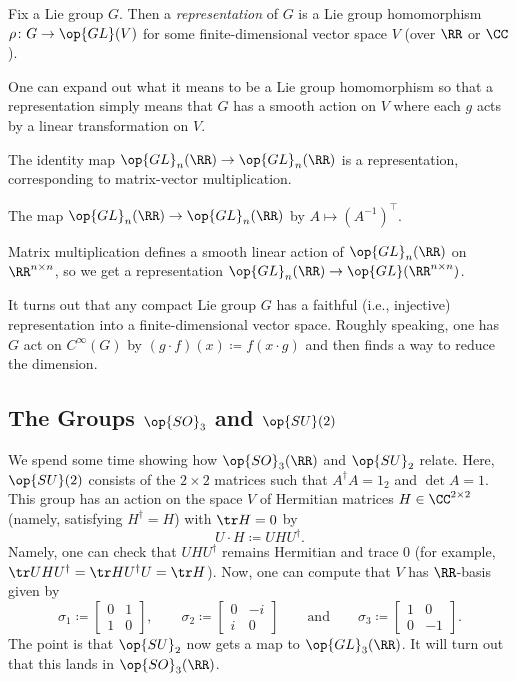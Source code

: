 \documentclass[../notes.tex]{subfiles}
\begin{document}
\begin{definition}
	Fix a Lie group $G$. Then a \textit{representation} of $G$ is a Lie group homomorphism $\rho\colon G\to\op{GL}(V)$ for some finite-dimensional vector space $V$ (over $\RR$ or $\CC$).
\end{definition}
\begin{remark}
	One can expand out what it means to be a Lie group homomorphism so that a representation simply means that $G$ has a smooth action on $V$ where each $g$ acts by a linear transformation on $V$.
\end{remark}
\begin{example}
	The identity map $\op{GL}_n(\RR)\to\op{GL}_n(\RR)$ is a representation, corresponding to matrix-vector multiplication.
\end{example}
\begin{example}
	The map $\op{GL}_n(\RR)\to\op{GL}_n(\RR)$ by $A\mapsto\left(A^{-1}\right)^\intercal$.
\end{example}
\begin{example}
	Matrix multiplication defines a smooth linear action of $\op{GL}_n(\RR)$ on $\RR^{n\times n}$, so we get a representation $\op{GL}_n(\RR)\to\op{GL}(\RR^{n\times n})$.
\end{example}
\begin{remark}
	It turns out that any compact Lie group $G$ has a faithful (i.e., injective) representation into a finite-dimensional vector space. Roughly speaking, one has $G$ act on $C^\infty(G)$ by $(g\cdot f)(x)\coloneqq f(x\cdot g)$ and then finds a way to reduce the dimension.
\end{remark}

\subsection{The Groups \texorpdfstring{$\op{SO}_3$}{SO3} and \texorpdfstring{$\op{SU}(2)$}{SU2}}
We spend some time showing how $\op{SO}_3(\RR)$ and $\op{SU}_2$ relate. Here, $\op{SU}(2)$ consists of the $2\times2$ matrices such that $A^\dagger A=1_2$ and $\det A=1$. This group has an action on the space $V$ of Hermitian matrices $H\in\CC^{2\times2}$ (namely, satisfying $H^\dagger=H$) with $\tr H=0$ by
\[U\cdot H\coloneqq UHU^\dagger.\]
Namely, one can check that $UHU^\dagger$ remains Hermitian and trace $0$ (for example, $\tr UHU^\dagger=\tr HU^\dagger U=\tr H$). Now, one can compute that $V$ has $\RR$-basis given by
\[\sigma_1\coloneqq\begin{bmatrix}
	0 & 1 \\
	1 & 0
\end{bmatrix},\qquad\sigma_2\coloneqq\begin{bmatrix}
	0 & -i \\
	i & 0
\end{bmatrix}\qquad\text{and}\qquad\sigma_3\coloneqq\begin{bmatrix}
	1 & 0 \\
	0 & -1
\end{bmatrix}.\]
The point is that $\op{SU}_2$ now gets a map to $\op{GL}_3(\RR)$. It will turn out that this lands in $\op{SO}_3(\RR)$.
\end{document}
